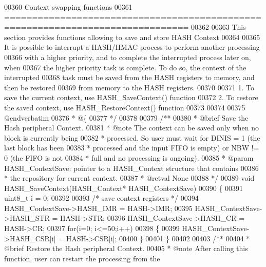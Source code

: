 \begin{DoxyCode}
00360 \textcolor{comment}{                             Context swapping functions}
00361 \textcolor{comment}{ ===============================================================================  }
00362 \textcolor{comment}{}
00363 \textcolor{comment}{  This section provides functions allowing to save and store HASH Context}
00364 \textcolor{comment}{  }
00365 \textcolor{comment}{  It is possible to interrupt a HASH/HMAC process to perform another processing }
00366 \textcolor{comment}{  with a higher priority, and to complete the interrupted process later on, when }
00367 \textcolor{comment}{  the higher priority task is complete. To do so, the context of the interrupted }
00368 \textcolor{comment}{  task must be saved from the HASH registers to memory, and then be restored }
00369 \textcolor{comment}{  from memory to the HASH registers.}
00370 \textcolor{comment}{  }
00371 \textcolor{comment}{  1. To save the current context, use HASH\_SaveContext() function}
00372 \textcolor{comment}{  2. To restore the saved context, use HASH\_RestoreContext() function }
00373 \textcolor{comment}{  }
00374 \textcolor{comment}{}
00375 \textcolor{comment}{@endverbatim}
00376 \textcolor{comment}{  * @\{}
00377 \textcolor{comment}{  */}
00378 
00379 \textcolor{comment}{/**}
00380 \textcolor{comment}{  * @brief  Save the Hash peripheral Context. }
00381 \textcolor{comment}{  * @note   The context can be saved only when no block is currently being }
00382 \textcolor{comment}{  *         processed. So user must wait for DINIS = 1 (the last block has been }
00383 \textcolor{comment}{  *         processed and the input FIFO is empty) or NBW != 0 (the FIFO is not }
00384 \textcolor{comment}{  *         full and no processing is ongoing).   }
00385 \textcolor{comment}{  * @param  HASH\_ContextSave: pointer to a HASH\_Context structure that contains}
00386 \textcolor{comment}{  *         the repository for current context.}
00387 \textcolor{comment}{  * @retval None}
00388 \textcolor{comment}{  */}
00389 \textcolor{keywordtype}{void} HASH_SaveContext(HASH\_Context* HASH\_ContextSave)
00390 \{
00391   uint8\_t i = 0;
00392 
00393   \textcolor{comment}{/* save context registers */}
00394   HASH\_ContextSave->HASH\_IMR = HASH->IMR;
00395   HASH\_ContextSave->HASH\_STR = HASH->STR;
00396   HASH\_ContextSave->HASH\_CR  = HASH->CR;
00397   \textcolor{keywordflow}{for}(i=0; i<=50;i++)
00398   \{
00399      HASH\_ContextSave->HASH\_CSR[i] = HASH->CSR[i];
00400   \}
00401 \}
00402 
00403 \textcolor{comment}{/**}
00404 \textcolor{comment}{  * @brief  Restore the Hash peripheral Context.  }
00405 \textcolor{comment}{  * @note   After calling this function, user can restart the processing from the}

\end{DoxyCode}
